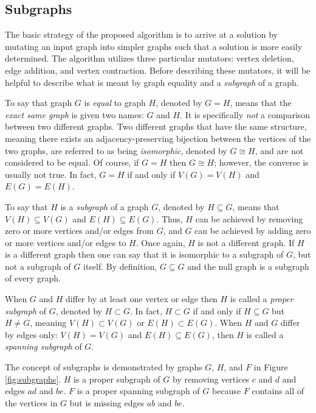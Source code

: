 \subsection{Subgraphs}

The basic strategy of the proposed algorithm is to arrive at a solution by mutating an input graph into simpler
graphs such that a solution is more easily determined.  The algorithm utilizes three particular mutators: vertex
deletion, edge addition, and vertex contraction.  Before describing these mutators, it will be helpful to describe
what is meant by graph equality and a \emph{subgraph} of a graph.

To say that graph \(G\) is \emph{equal} to graph \(H\), denoted by \(G=H\), means that the \emph{exact same graph}
is given two names: \(G\) and \(H\).  It is specifically \emph{not} a comparison between two different graphs.  Two
different graphs that have the same structure, meaning there exists an adjacency-preserving bijection between the
vertices of the two graphs, are referred to as being \emph{isomorphic}, denoted by \(G\cong H\), and are not
considered to be equal.  Of course, if \(G=H\) then \(G\cong H\); however, the converse is usually not true.  In
fact, \(G=H\) if and only if \(V(G)=V(H)\) and \(E(G)=E(H)\).

To say that \(H\) is a \emph{subgraph} of a graph \(G\), denoted by \(H\subseteq G\), means that \(V(H)\subseteq
V(G)\) and \(E(H)\subseteq E(G)\).  Thus, \(H\) can be achieved by removing zero or more vertices and/or edges from
\(G\), and \(G\) can be achieved by adding zero or more vertices and/or edges to \(H\).  Once again, \(H\) is not a
different graph.  If \(H\) is a different graph then one can say that it is isomorphic to a subgraph of \(G\), but
not a subgraph of \(G\) itself.  By definition, \(G\subseteq G\) and the null graph is a subgraph of every graph.

When \(G\) and \(H\) differ by at least one vertex or edge then \(H\) is called a \emph{proper subgraph} of \(G\),
denoted by \(H\subset G\).  In fact, \(H\subset G\) if and only if \(H\subseteq G\) but \(H\ne G\), meaning
\(V(H)\subset V(G)\) or \(E(H)\subset E(G)\).  When \(H\) and \(G\) differ by edges only: \(V(H)=V(G)\) and
\(E(H)\subseteq E(G)\), then \(H\) is called a \emph{spanning subgraph} of \(G\).

The concept of subgraphs is demonstrated by graphs \(G\), \(H\), and \(F\) in Figure \ref{fig:subgraphs}.  \(H\) is
a proper subgraph of \(G\) by removing vertices \(c\) and \(d\) and edges \(ad\) and \(be\).  \(F\) is a proper
spanning subgraph of \(G\) because \(F\) contains all of the vertices in \(G\) but is missing edges \(ab\) and
\(be\).

